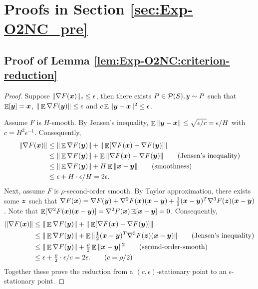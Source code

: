 \section{Proofs in Section \ref{sec:Exp-O2NC_pre}}
\label{app:Exp-O2NC:pre}

\subsection{Proof of Lemma \ref{lem:Exp-O2NC:criterion-reduction}}

\CriterionReduction*

\begin{proof}
Suppose $\|\nabla F({\boldsymbol{x}})\|_c \le \epsilon$, then there exists $P\in{\cal P}(S), y\sim P$ such that $\mathop{\mathbb{E}}[{\boldsymbol{y}}]={\boldsymbol{x}}$, $\|\mathop{\mathbb{E}} \nabla F({\boldsymbol{y}})\| \le \epsilon$ and $c\mathop{\mathbb{E}}\|{\boldsymbol{y}}-{\boldsymbol{x}}\|^2 \le \epsilon$. 

Assume $F$ is $H$-smooth. By Jensen's inequality, $\mathop{\mathbb{E}}\|{\boldsymbol{y}}-{\boldsymbol{x}}\| \le \sqrt{\epsilon/c} = \epsilon/H$ with $c=H^2\epsilon^{-1}$. Consequently,
\begin{align*}
    \|\nabla F({\boldsymbol{x}})\|
    &\le \|\mathop{\mathbb{E}}\nabla F({\boldsymbol{y}})\| + \|\mathop{\mathbb{E}}[\nabla F({\boldsymbol{x}}) - \nabla F({\boldsymbol{y}})]\| \\
    &\le \|\mathop{\mathbb{E}}\nabla F({\boldsymbol{y}})\| + \mathop{\mathbb{E}}\|\nabla F({\boldsymbol{x}}) - \nabla F({\boldsymbol{y}})\| \tag{Jensen's inequality}\\
    &\le \|\mathop{\mathbb{E}}\nabla F({\boldsymbol{y}})\| + H\mathop{\mathbb{E}}\|{\boldsymbol{x}}-{\boldsymbol{y}}\| \tag{smoothness}\\
    &\le \epsilon + H \cdot \epsilon/H = 2\epsilon. 
\end{align*}
Next, assume $F$ is $\rho$-second-order smooth. By Taylor approximation, there exists some ${\boldsymbol{z}}$ such that $\nabla F({\boldsymbol{x}}) = \nabla F({\boldsymbol{y}}) + \nabla^2F({\boldsymbol{x}})({\boldsymbol{x}}-{\boldsymbol{y}}) + \frac{1}{2}({\boldsymbol{x}}-{\boldsymbol{y}})^T\nabla^3F({\boldsymbol{z}})({\boldsymbol{x}}-{\boldsymbol{y}})$. Note that $\mathop{\mathbb{E}}[\nabla^2F({\boldsymbol{x}})({\boldsymbol{x}}-{\boldsymbol{y}})]=\nabla^2F({\boldsymbol{x}})\mathop{\mathbb{E}}[{\boldsymbol{x}}-{\boldsymbol{y}}]=0$. Consequently,
\begin{align*}
    \|\nabla F({\boldsymbol{x}})\|
    &\le \|\mathop{\mathbb{E}}\nabla F({\boldsymbol{y}})\| + \|\mathop{\mathbb{E}}[\nabla F({\boldsymbol{x}})-\nabla F({\boldsymbol{y}})]\| \\
    &\le \|\mathop{\mathbb{E}}\nabla F({\boldsymbol{y}})\| + \mathop{\mathbb{E}}\|\tfrac{1}{2}({\boldsymbol{x}}-{\boldsymbol{y}})^T\nabla^3F({\boldsymbol{z}})({\boldsymbol{x}}-{\boldsymbol{y}})\| \tag{Jensen's inequality}\\
    &\le \|\mathop{\mathbb{E}}\nabla F({\boldsymbol{y}})\| + \tfrac{\rho}{2} \mathop{\mathbb{E}}\|{\boldsymbol{x}}-{\boldsymbol{y}}\|^2 \tag{second-order-smooth}\\
    &\le \epsilon + \tfrac{\rho}{2}\cdot \epsilon/c = 2\epsilon. \tag{$c=\rho/2$}
\end{align*}
Together these prove the reduction from a $(c,\epsilon)$-stationary point to an $\epsilon$-stationary point.
\end{proof}


